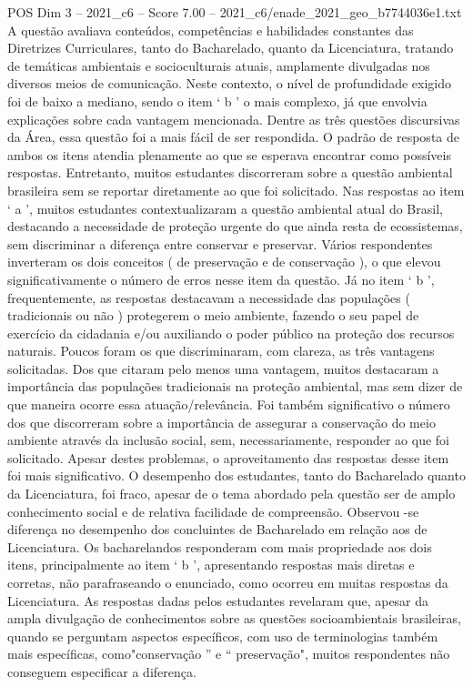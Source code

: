 \begin{textsample}{POS Dim 3 – 2021\_c6 – Score 7.00 – 2021\_c6/enade\_2021\_geo\_b7744036e1.txt}
A questão avaliava conteúdos, competências e habilidades constantes das Diretrizes Curriculares, tanto do Bacharelado, quanto da Licenciatura, tratando de temáticas ambientais e socioculturais atuais, amplamente divulgadas nos diversos meios de comunicação.
Neste contexto, o nível de profundidade exigido foi de baixo a mediano, sendo o item ‘ b ’ o mais complexo, já que envolvia explicações sobre cada vantagem mencionada.
Dentre as três questões discursivas da Área, essa questão foi a mais fácil de ser respondida.
O padrão de resposta de ambos os itens atendia plenamente ao que se esperava encontrar como possíveis respostas.
Entretanto, muitos estudantes discorreram sobre a questão ambiental brasileira sem se reportar diretamente ao que foi solicitado.
Nas respostas ao item ‘ a ’, muitos estudantes contextualizaram a questão ambiental atual do Brasil, destacando a necessidade de proteção urgente do que ainda resta de ecossistemas, sem discriminar a diferença entre conservar e preservar.
Vários respondentes inverteram os dois conceitos ( de preservação e de conservação ), o que elevou significativamente o número de erros nesse item da questão.
Já no item ‘ b ’, frequentemente, as respostas destacavam a necessidade das populações ( tradicionais ou não ) protegerem o meio ambiente, fazendo o seu papel de exercício da cidadania e/ou auxiliando o poder público na proteção dos recursos naturais.
Poucos foram os que discriminaram, com clareza, as três vantagens solicitadas.
Dos que citaram pelo menos uma vantagem, muitos destacaram a importância das populações tradicionais na proteção ambiental, mas sem dizer de que maneira ocorre essa atuação/relevância.
Foi também significativo o número dos que discorreram sobre a importância de assegurar a conservação do meio ambiente através da inclusão social, sem, necessariamente, responder ao que foi solicitado.
Apesar destes problemas, o aproveitamento das respostas desse item foi mais significativo.
O desempenho dos estudantes, tanto do Bacharelado quanto da Licenciatura, foi fraco, apesar de o tema abordado pela questão ser de amplo conhecimento social e de relativa facilidade de compreensão.
Observou -se diferença no desempenho dos concluintes de Bacharelado em relação aos de Licenciatura.
Os bacharelandos responderam com mais propriedade aos dois itens, principalmente ao item ‘ b ’, apresentando respostas mais diretas e corretas, não parafraseando o enunciado, como ocorreu em muitas respostas da Licenciatura.
As respostas dadas pelos estudantes revelaram que, apesar da ampla divulgação de conhecimentos sobre as questões socioambientais brasileiras, quando se perguntam aspectos específicos, com uso de terminologias também mais específicas, como"conservação ” e “ preservação", muitos respondentes não conseguem especificar a diferença.

\end{textsample}
